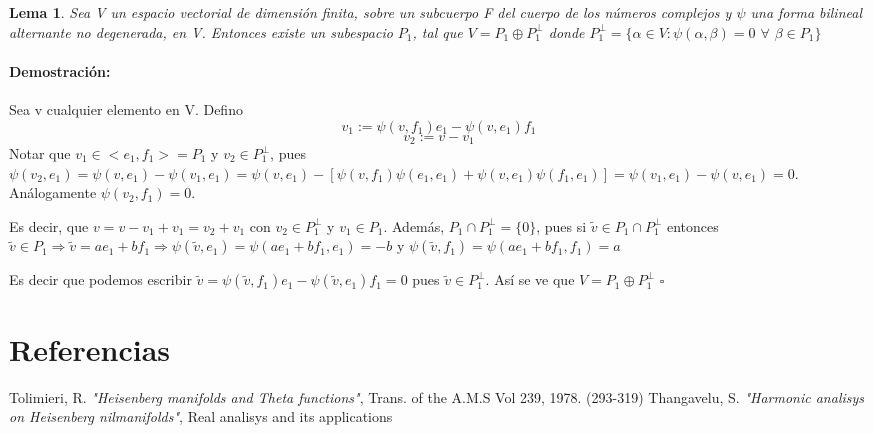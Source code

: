 \documentclass[12pt]{article}
\newtheorem{lemma}{Lema}
\newenvironment{proof}{\paragraph{Demostración:}}{\hfill$\square$}
\begin{document}
\begin{lemma}
 Sea V un espacio vectorial de dimensión finita, sobre un subcuerpo F del cuerpo de los números complejos y
 $\psi$ una forma bilineal alternante no degenerada, en V.
 Entonces existe un subespacio $P_1$, tal que \newline
 $V = P_1 \oplus P_1^{\bot}$
 donde $P_1^{\bot}= \{ \alpha \in V: \psi(\alpha,\beta)=0$  $\forall$  $\beta \in P_1 \} $
 \end{lemma}
 
 \begin{proof}
 Sea v cualquier elemento en V.
 Defino 
 $$v_1:=\psi(v,f_1)e_1-\psi(v,e_1)f_1$$
 $$v_2:=v-v_1$$
 Notar que $v_1 \in <e_1,f_1>=P_1$ y $v_2 \in P_1^{\bot}$, pues 
 $\psi(v_2,e_1)=\psi(v,e_1)-\psi(v_1,e_1)=\psi (v,e_1)-[\psi(v,f_1) \psi(e_1,e_1) + \psi(v,e_1) \psi(f_1,e_1)]=
 \psi(v_1,e_1)- \psi(v,e_1)=0$.\newline
 Análogamente $\psi(v_2,f_1)=0$.
 
 Es decir, que $v=v-v_1+v_1=v_2 + v_1$ con $v_2 \in P_1^{\bot}$ y $v_1 \in P_1$.\newline
 Además, $P_1  \cap P_1^{\bot} = \{0\}$, pues si  $\tilde{v} \in  P_1 \cap P_1^{\bot}$ entonces
 $\tilde{v} \in P_1 \Rightarrow \tilde{v}=a e_1 + b f_1 \Rightarrow 
 \psi(\tilde{v},e_1)=\psi(a e_1 + b f_1,e_1)=-b$ y $\psi(\tilde{v},f_1)=\psi(a e_1 + b f_1,f_1)=a $
 
 Es decir que podemos escribir $\tilde{v}=\psi(\tilde{v},f_1) e_1 - \psi(\tilde{v},e_1) f_1=0$ pues 
 $\tilde{v} \in P_1^{\bot}.$
 Así se ve que $V = P_1 \oplus P_1^{\bot}$ 
\end{proof} 






 \section{Referencias}
  \begin{thebibliography}{1}
   Tolimieri, R.   \emph{"Heisenberg manifolds and Theta functions"}, Trans. of the A.M.S Vol 239, 1978. (293-319)
   Thangavelu, S.  \emph{"Harmonic analisys on Heisenberg nilmanifolds"}, Real analisys and its applications
  \end{thebibliography}
\end{document}
